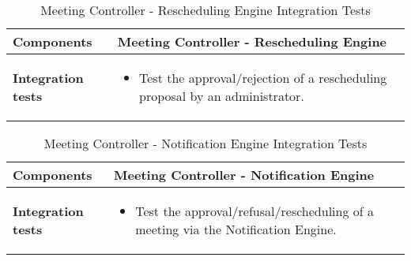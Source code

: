 \begin{table}[H]	
	\centering
	\def\arraystretch{1.5}
	\begin{tabular}{|m{4cm}|m{12cm}|}
		\hline
		\textbf{Components} & Meeting Controller - Rescheduling Engine \\ \hline
		\textbf{Integration tests} & 
			\begin{itemize}
			\item Test the approval/rejection of a rescheduling proposal by an administrator.
			\end{itemize} \\ \hline
	\end{tabular}
	\caption{Meeting Controller - Rescheduling Engine Integration Tests}
\end{table}

\begin{table}[H]	
	\centering
	\def\arraystretch{1.5}
	\begin{tabular}{|m{4cm}|m{12cm}|}
		\hline
		\textbf{Components} & Meeting Controller - Notification Engine \\ \hline
		\textbf{Integration tests} & 
			\begin{itemize}
			\item Test the approval/refusal/rescheduling of a meeting via the Notification Engine.
			\end{itemize} \\ \hline
	\end{tabular}
	\caption{Meeting Controller - Notification Engine Integration Tests}
\end{table}